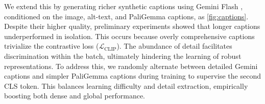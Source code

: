 We extend this by generating richer synthetic captions using Gemini Flash \citep{geminiteam2024gemini}, conditioned on the image, alt-text, and PaliGemma captions, as \cref{fig:captions}.
Despite their higher quality, preliminary experiments showed that longer captions underperformed in isolation.
This occurs because overly comprehensive captions trivialize the contrastive loss ($\mathcal{L}_\text{CLIP}$).
The abundance of detail facilitates discrimination within the batch, ultimately hindering the learning of robust representations.
To address this, we randomly alternate between detailed Gemini captions and simpler PaliGemma captions during training to supervise the second CLS token. 
This balances learning difficulty and detail extraction, empirically boosting both dense and global performance.










